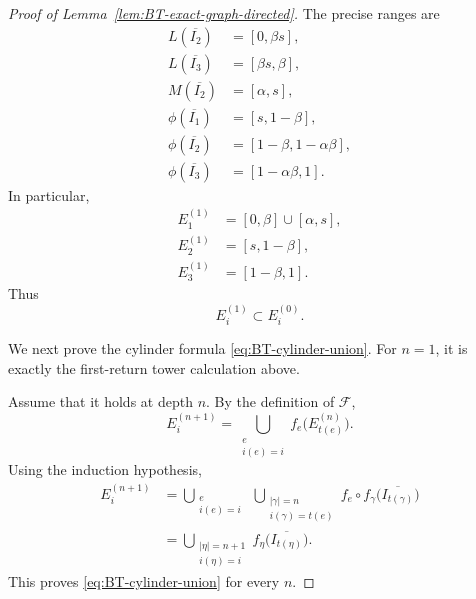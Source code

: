 \documentclass[11pt]{amsart}
\theoremstyle{plain}
\theoremstyle{definition}
\theoremstyle{remark}
\begin{document}
\begin{proof}[Proof of Lemma~\ref{lem:BT-exact-graph-directed}]
The precise ranges are
\[
\begin{aligned}
        L(\overline{I_2})
        &=[0,\beta s],\\
        L(\overline{I_3})
        &=[\beta s,\beta],\\
        M(\overline{I_2})
        &=[\alpha,s],\\
        \phi(\overline{I_1})
        &=[s,1-\beta],\\
        \phi(\overline{I_2})
        &=[1-\beta,1-\alpha\beta],\\
        \phi(\overline{I_3})
        &=[1-\alpha\beta,1].
\end{aligned}
\tag{B.1}
\label{eq:BT-first-level-ranges}
\]
In particular,
\[
\begin{aligned}
        E_1^{(1)}
        &=
        [0,\beta]\cup[\alpha,s],\\
        E_2^{(1)}
        &=
        [s,1-\beta],\\
        E_3^{(1)}
        &=
        [1-\beta,1].
\end{aligned}
\]
Thus
\[
        E_i^{(1)}\subset E_i^{(0)}.
\tag{B.2}
\label{eq:BT-first-nesting}
\]

We next prove the cylinder formula
\eqref{eq:BT-cylinder-union}. For \(n=1\), it is exactly the first-return
tower calculation above.

Assume that it holds at depth \(n\). By the definition of
\(\mathcal F\),
\[
        E_i^{(n+1)}
        =
        \bigcup_{\substack{e\\i(e)=i}}
        f_e\bigl(E_{t(e)}^{(n)}\bigr).
\]
Using the induction hypothesis,
\[
\begin{aligned}
        E_i^{(n+1)}
        &=
        \bigcup_{\substack{e\\i(e)=i}}
        \;
        \bigcup_{\substack{|\gamma|=n\\
        i(\gamma)=t(e)}}
        f_e\circ f_\gamma
        \bigl(\overline{I_{t(\gamma)}}\bigr)\\
        &=
        \bigcup_{\substack{|\eta|=n+1\\i(\eta)=i}}
        f_\eta
        \bigl(\overline{I_{t(\eta)}}\bigr).
\end{aligned}
\]
This proves \eqref{eq:BT-cylinder-union} for every \(n\).


\end{proof}
\end{document}
